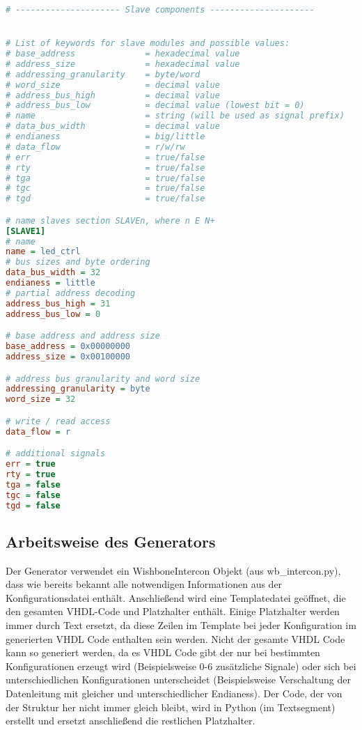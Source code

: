 \documentclass{article}
\begin{document}
\begin{lstlisting}[language={Ini},frame=single]
# --------------------- Slave components ---------------------


# List of keywords for slave modules and possible values:
# base_address              = hexadecimal value
# address_size              = hexadecimal value
# addressing_granularity    = byte/word
# word_size                 = decimal value
# address_bus_high          = decimal value
# address_bus_low           = decimal value (lowest bit = 0)
# name                      = string (will be used as signal prefix)
# data_bus_width            = decimal value
# endianess                 = big/little
# data_flow                 = r/w/rw
# err                       = true/false
# rty                       = true/false
# tga                       = true/false
# tgc                       = true/false
# tgd                       = true/false

# name slaves section SLAVEn, where n E N+
[SLAVE1]
# name
name = led_ctrl
# bus sizes and byte ordering
data_bus_width = 32
endianess = little
# partial address decoding
address_bus_high = 31
address_bus_low = 0

# base address and address size
base_address = 0x00000000
address_size = 0x00100000

# address bus granularity and word size
addressing_granularity = byte
word_size = 32

# write / read access
data_flow = r

# additional signals
err = true
rty = true
tga = false
tgc = false
tgd = false
\end{lstlisting}
\subsection{Arbeitsweise des Generators}
Der Generator verwendet ein WishboneIntercon Objekt (aus wb\_intercon.py), dass wie bereits bekannt alle notwendigen Informationen aus der Konfigurationsdatei enthält. Anschließend wird eine Templatedatei geöffnet, die den gesamten VHDL-Code und Platzhalter enthält. Einige Platzhalter werden immer durch Text ersetzt, da diese Zeilen im Template bei jeder Konfiguration im generierten VHDL Code enthalten sein werden. Nicht der gesamte VHDL Code kann so generiert werden, da es VHDL Code gibt der nur bei bestimmten Konfigurationen erzeugt wird (Beispielsweise 0-6 zusätzliche Signale) oder sich bei unterschiedlichen Konfigurationen unterscheidet (Beispielsweise Verschaltung der Datenleitung mit gleicher und unterschiedlicher Endianess). Der Code, der von der Struktur her nicht immer gleich bleibt, wird in Python (im Textsegment) erstellt und ersetzt anschließend die restlichen Platzhalter.
\end{document}
